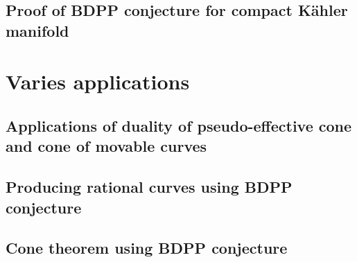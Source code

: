 \documentclass[11pt]{article}
\theoremstyle{definition}
\begin{document}
	\subsection{Proof of BDPP conjecture for compact K\"ahler manifold}
	
	\section{Varies applications}
	\subsection{Applications of duality of pseudo-effective cone and cone of movable curves}
	
	\subsection{Producing rational curves using BDPP conjecture}
	
	\subsection{Cone theorem using BDPP conjecture}
	
	
	
	
\end{document}
